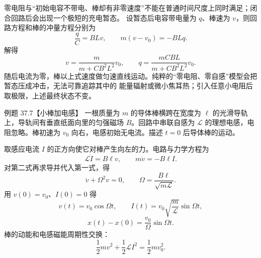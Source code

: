 \begin{xesolution}
零电阻与“初始电容不带电、棒却有非零速度”不能在普通时间尺度上同时满足；闭合回路后会出现一个极短的充电暂态。
设暂态后电容带电量为 $q$、棒速为 $v$，则回路方程和棒的冲量方程分别为
\begin{equation}
  \frac qC=BLv,
  \qquad m(v-v_0)=-BLq.
\end{equation}
解得
\begin{equation}
  \boxed{v=\frac{m}{m+CB^2L^2}v_0},
  \qquad
  \boxed{q=\frac{mCBL}{m+CB^2L^2}v_0}.
\end{equation}
随后电流为零，棒以上式速度做匀速直线运动。纯粹的“零电阻、零自感”模型会把暂态压成冲击，无法可靠追踪其中的
能量辐射或微小焦耳热；引入任意小电阻后取极限，上述最终状态不变。

\rodCapacitorDiagram
\end{xesolution}

\Needspace{0.12\textheight}
\begin{origexamplebox}{例题 37.7【小棒加电感】}
一根质量为 $m$ 的导体棒横跨在宽度为 $\ell$ 的光滑导轨上，导轨间有垂直纸面向里的匀强磁场 $B$。回路中串联自感为 $\mathcal L$
的理想电感，电阻忽略。棒初速为 $v_0$ 向右，电感初始无电流。描述 $t=0$ 后导体棒的运动。
\end{origexamplebox}

\begin{xesolution}
取感应电流 $I$ 的正方向使它对棒产生向左的力。电路与力学方程为
\begin{equation}
  \mathcal L\dot I=B\ell v,
  \qquad m\dot v=-B\ell I.
\end{equation}
对第二式再求导并代入第一式，得
\begin{equation}
  \ddot v+\Omega^2v=0,
  \qquad
  \Omega=\frac{B\ell}{\sqrt{m\mathcal L}}.
\end{equation}
用 $v(0)=v_0$、$I(0)=0$ 得
\begin{equation}
  \boxed{v(t)=v_0\cos\Omega t},
  \qquad
  \boxed{I(t)=v_0\sqrt{\frac m{\mathcal L}}\sin\Omega t},
\end{equation}
\begin{equation}
  \boxed{x(t)-x(0)=\frac{v_0}{\Omega}\sin\Omega t}.
\end{equation}
棒的动能和电感磁能周期性交换：
\begin{equation}
  \frac12mv^2+\frac12\mathcal LI^2=\frac12mv_0^2.
\end{equation}

\rodInductorDiagram
\end{xesolution}

